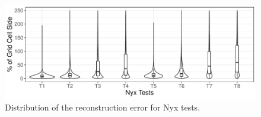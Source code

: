\begin{figure}[!h]
\centering
\includegraphics[width=\linewidth]{Images/Nyx_Tests.pdf}
\caption{Distribution of the reconstruction error for Nyx tests.}
\label{fig:nyx_plot}
\end{figure}
